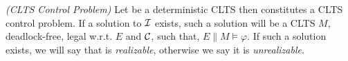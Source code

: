 \begin{definition}
	\label{def:clts_control_problem} \emph{(CLTS Control Problem)} 
	Let  be a deterministic CLTS then \controlProblemDef constitutes a CLTS control problem. If a solution to $\mathcal{I}$ exists, such a solution will be a CLTS $M$, deadlock-free, legal w.r.t. $E$ and $\mathcal{C}$, such that, $E \parallel M \models \varphi$. If such a solution exists, we will say that \controlProblem is \emph{realizable}, otherwise we say it is \emph{unrealizable}.
\end{definition}
